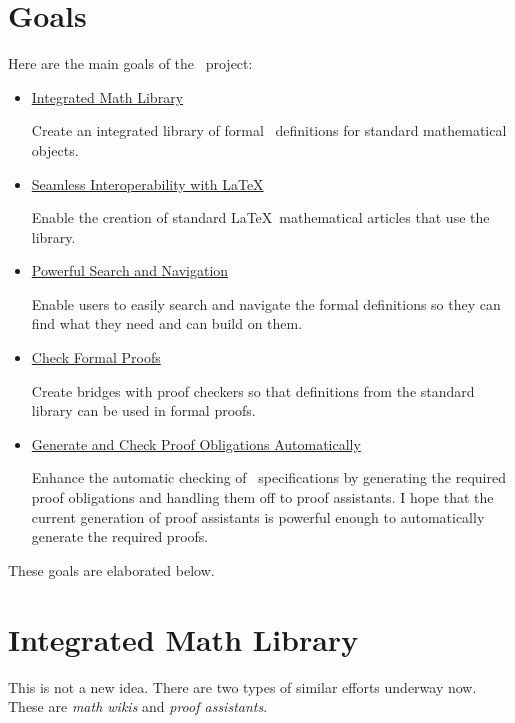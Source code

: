 \documentclass{amsart}
\begin{document}
\section{Goals}

Here are the main goals of the \mathz\ project:
\begin{itemize}

\item \hyperlink{integrated-math-library}{Integrated Math Library}

Create an integrated library of formal \ZN\ definitions for standard mathematical objects.

\item \hyperlink{seamless-interoperability-with-latex}{Seamless Interoperability with \LaTeX}

Enable the creation of standard \LaTeX\ mathematical articles that use the library.

\item \hyperlink{powerful-search-and-navigation}{Powerful Search and Navigation}

Enable users to easily search and navigate the formal definitions so they can find what they need and can build on them.

\item \hyperlink{check-formal-proof}{Check Formal Proofs}

Create bridges with proof checkers so that definitions from the standard library can be used in formal proofs.

\item \hyperlink{generate-and-check-proof-obligations-automatically}{Generate and Check Proof Obligations Automatically}

Enhance the automatic checking of \ZN\ specifications by generating the required proof obligations and handling them off to proof assistants.
I hope that the current generation of proof assistants is powerful enough to automatically generate the required proofs.

\end{itemize}

These goals are elaborated below.

\hypertarget{integrated-math-library}{}
\section{Integrated Math Library}

This is not a new idea. There are two types of similar efforts underway now.
These are \emph{math wikis} and \emph{proof assistants}.
\end{document}
